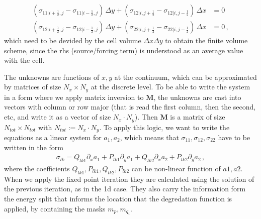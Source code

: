 \documentclass[11pt,a4paper]{article}
\newcommand{\p}{\partial}
\newcommand{\bb}[1]{\boldsymbol{#1}}
\begin{document}
\begin{align*}
    \left(\sigma_{11| i+\frac{1}{2},j}-\sigma_{11| i-\frac{1}{2},j}\right) \, \Delta y
    +
    \left(\sigma_{12| i,j+\frac{1}{2}}-\sigma_{12| i,j-\frac{1}{2}} \right) \, \Delta x
    &
    = 0 
    \\
    \left(\sigma_{12| i+\frac{1}{2},j}-\sigma_{12| i-\frac{1}{2},j}\right) \, \Delta y
    +
    \left(\sigma_{22| i,j+\frac{1}{2}}-\sigma_{22| i,j-\frac{1}{2}} \right) \, \Delta x
    &
    = 0 \,,
\end{align*}
which need to be devided by the cell volume $\Delta x \Delta y$ to obtain the finite volume scheme, since the rhs (source/forcing term) is understood as an average value with the cell.



The unknowns are functions of $x,y$ at the continuum, which can be approximated by matrices of size $N_x \times N_y$ at the discrete level. To be able to write the system in a form where we apply matrix inversion to $\bb{M}$, the unknowns are cast into vectors with column or row major (that is read the first column, then the second, etc, and write it as a vector of size $N_x \cdot N_y$). Then $\bb{M}$ is a matrix of size $N_{tot} \times N_{tot}$ with $N_{tot}:= N_x \cdot N_y$. To apply this logic, we want to write the equations as a linear system for $a_1,a_2$, which means that $\sigma_{11}, \sigma_{12}, \sigma_{22}$ have to be written in the form
\begin{align*}
    \sigma_{lk} = Q_{lk1}\p_x a_1 + P_{lk1} \p_y a_1
     + Q_{lk2} \p_x a_2 + P_{lk2} \p_y a_2
     \,,
\end{align*}
where the coefficients $Q_{lk1}, P_{lk1}, Q_{lk2}, P_{lk2}$ can be non-linear function of $a1,a2$. When we apply the fixed point iteration they are calculated using the solution of the previous iteration, as in the 1d case. They also carry the information form the energy split that informs the location that the degredation function is applied, by containing the masks $m_p, m_{q_i}$.
\end{document}
